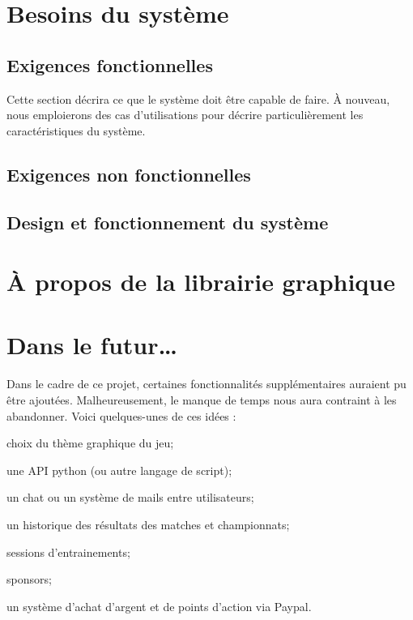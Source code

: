 \documentclass[a4paper, 11pt]{report}
\begin{document}
\chapter{Besoins du système}
\section{Exigences fonctionnelles}
Cette section décrira ce que le système doit être capable de faire. À nouveau, nous emploierons des cas d'utilisations pour décrire particulièrement les caractéristiques du système.



\section{Exigences non fonctionnelles}


\section{Design et fonctionnement du système}



\appendix

\chapter{À propos de la librairie graphique}


\chapter{Dans le futur…}
Dans le cadre de ce projet, certaines fonctionnalités  supplémentaires auraient pu être ajoutées. 
Malheureusement, le manque de temps nous aura contraint à les abandonner. 
Voici quelques-unes de ces idées :
\begin{list}{}{\leftmargin=1.5em}
\item{choix du thème graphique du jeu;}
\item{une API python (ou autre langage de script);}
\item{un chat ou un système de mails entre utilisateurs;}
\item{un historique des résultats des matches et championnats;}
\item{sessions d'\gls{entrainement}s;}
\item{\gls{sponsor}s;}
\item{un système d'achat d'argent et de points d'action via Paypal.}
\end{list}
\end{document}
